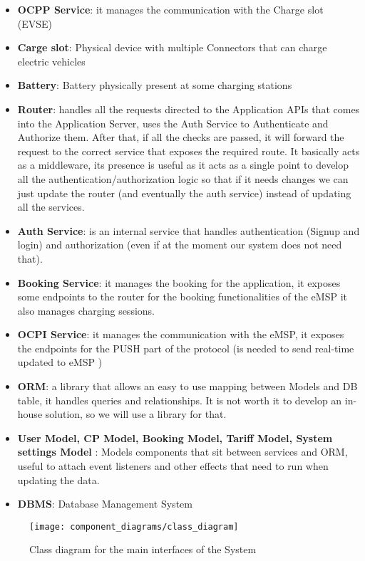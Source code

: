 \begin{itemize}
	\item \textbf{OCPP Service}: it manages the communication with the Charge slot (EVSE)
	\item \textbf{Carge slot}: Physical device with multiple Connectors that can charge electric vehicles
	\item \textbf{Battery}: Battery physically present at some charging stations
	\item \textbf{Router}: handles all the requests directed to the Application APIs that comes into the Application Server, uses the Auth Service to Authenticate and Authorize them. After that, if all the checks are passed, it will forward the request to the correct service that exposes the required route. It basically acts as a middleware, its presence is useful as it acts as a single point to develop all the authentication/authorization logic so that if it needs changes we can just update the router (and eventually the auth service) instead of updating all the services.
	\item \textbf{Auth Service}: is an internal service that handles authentication (Signup and login) and authorization (even if at the moment our system does not need that).
	\item \textbf{Booking Service}: it manages the booking for the application, it exposes some endpoints to the router for the booking functionalities of the eMSP it also manages charging sessions.
	\item \textbf{OCPI Service}: it manages the communication with the eMSP, it exposes the endpoints for the PUSH part of the protocol (is needed to send real-time updated to eMSP )
	\item \textbf{ORM}: a library that allows an easy to use mapping between Models and DB table, it handles queries and relationships. It is not worth it to develop an in-house solution, so we will use a library for that.
	\item \textbf{User Model, CP Model, Booking Model, Tariff Model, System settings Model }: Models components that sit between services and ORM, useful to attach event listeners and other effects that need to run when updating the data. 
	\item \textbf{DBMS}: Database Management System
\end{itemize}

\begin{figure}[h]
\texttt{[image: component\_diagrams/class\_diagram]}
\caption{Class diagram for the main interfaces of the System}
\end{figure}
	
